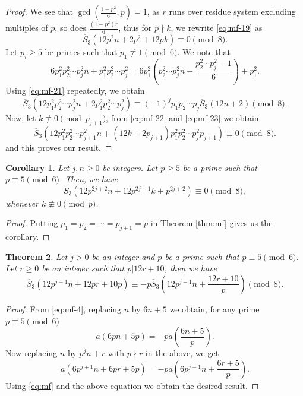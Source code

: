 \documentclass[12pt]{amsart}
\newcommand{\sst}{\overline{S}}
\theoremstyle{plain}
\newtheorem{theorem}{Theorem}[section]
\newtheorem{corollary}[theorem]{Corollary}
\theoremstyle{definition}
\begin{document}
\begin{proof}
    We see that $\gcd\left(\frac{1-p^2}{6},p\right)=1$, as $r$ runs over residue system excluding multiples of $p$, so does $\frac{(1-p^2)r}{6}$, thus for $p\nmid k$, we rewrite \eqref{eq:mf-19} as
    \begin{equation}\label{eq:mf-22}
        \sst_3(12p^2n+2p^2+12pk)\equiv 0 \pmod 8.
    \end{equation}
Let $p_i\geq 5$ be primes such that $p_1\not\equiv 1 \pmod 6$. We note that
\[
6p_1^2p_2^2\cdots p_j^2n+p_1^2p_2^2\cdots p_j^2=6p_1^2\left(p_2^2\cdots p_j^2n+\frac{p_2^2\cdots p_j^2-1}{6}\right)+p_1^2.
\]
Using \eqref{eq:mf-21} repeatedly, we obtain
\begin{equation}\label{eq:mf-23}
    \sst_3(12p_1^2p_2^2\cdots p_j^2n+2p_1^2p_2^2\cdots p_j^2)\equiv (-1)^jp_1p_2\cdots p_j\sst_3(12n+2)\pmod 8.
\end{equation}
Now, let $k\not\equiv 0 \pmod{p_{j+1}}$, from \eqref{eq:mf-22} and \eqref{eq:mf-23} we obtain
\[
\sst_3(12p_1^2p_2^2\cdots p_{j+1}^2n+(12k+2p_{j+1})p_1^2p_2^2\cdots p_j^2p_{j+1})\equiv 0 \pmod8.
\]
and this proves our result.
\end{proof}

\begin{corollary}
    Let $j, n \geq 0$ be integers. Let $p\geq 5$ be a prime such that $p\equiv 5\pmod 6$. Then, we have
    \[
    \sst_3(12p^{2j+2}n+12p^{2j+1}k+p^{2j+2})\equiv 0 \pmod 8,
    \]
    whenever $k\not\equiv 0\pmod p$.
\end{corollary}
\begin{proof}
    Putting $p_1=p_2=\cdots =p_{j+1}=p$ in Theorem \ref{thm:mf} gives us the corollary.
\end{proof}


\begin{theorem}\label{thm:mf-2}
    Let $j>0$ be an integer and $p$ be a prime such that $p\equiv 5\pmod 6$. Let $r\geq 0$ be an integer such that $p|12r+10$, then we have
    \[
    \sst_3(12p^{j+1}n+12pr+10p) \equiv -p\sst_3\left(12p^{j-1}n+\frac{12r+10}{p}\right) \pmod8.
    \]
\end{theorem}

\begin{proof}
    From \eqref{eq:mf-4}, replacing $n$ by $6n+5$ we obtain, for any prime $p\equiv 5 \pmod 6$
    \[
    a(6pn+5p)=-pa\left(\frac{6n+5}{p}\right).
    \]
    Now replacing $n$ by $p^jn+r$ with $p\nmid r$ in the above, we get
    \[
    a(6p^{j+1}n+6pr+5p)=-pa\left(6p^{j-1}n+\frac{6r+5}{p}\right).
    \]
    Using \eqref{eq:mf} and the above equation we obtain the desired result.
\end{proof}
\end{document}
